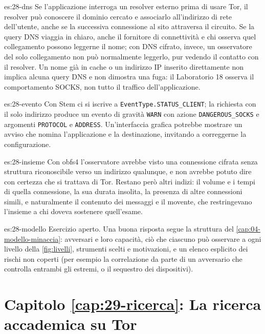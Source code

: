 \begin{soluzione}{es:28-dns}
Se l'applicazione interroga un resolver esterno prima di usare Tor, il resolver può conoscere il dominio cercato e associarlo all'indirizzo di rete dell'utente, anche se la successiva connessione al sito attraversa il circuito. Se la query DNS viaggia in chiaro, anche il fornitore di connettività e chi osserva quel collegamento possono leggerne il nome; con DNS cifrato, invece, un osservatore del solo collegamento non può normalmente leggerlo, pur vedendo il contatto con il resolver. Un nome già in cache o un indirizzo IP inserito direttamente non implica alcuna query DNS e non dimostra una fuga: il Laboratorio 18 osserva il comportamento SOCKS, non tutto il traffico dell'applicazione.
\end{soluzione}

\begin{soluzione}{es:28-evento}
Con Stem ci si iscrive a \texttt{EventType.STATUS\_CLIENT}; la richiesta con il solo indirizzo produce un evento di gravità \texttt{WARN} con azione \texttt{DANGEROUS\_SOCKS} e argomenti \texttt{PROTOCOL} e \texttt{ADDRESS}. Un'interfaccia grafica potrebbe mostrare un avviso che nomina l'applicazione e la destinazione, invitando a correggerne la configurazione.
\end{soluzione}

\begin{soluzione}{es:28-insieme}
Con obfs4 l'osservatore avrebbe visto una connessione cifrata senza struttura riconoscibile verso un indirizzo qualunque, e non avrebbe potuto dire con certezza che si trattava di Tor. Restano però altri indizi: il volume e i tempi di quella connessione, la sua durata insolita, la presenza di altre connessioni simili, e naturalmente il contenuto dei messaggi e il movente, che restringevano l'insieme a chi doveva sostenere quell'esame.
\end{soluzione}

\begin{soluzione}{es:28-modello}
Esercizio aperto. Una buona risposta segue la struttura del \cref{cap:04-modello-minaccia}: avversari e loro capacità, ciò che ciascuno può osservare a ogni livello della \cref{fig:livelli}, strumenti scelti e motivazioni, e un elenco esplicito dei rischi non coperti (per esempio la correlazione da parte di un avversario che controlla entrambi gli estremi, o il sequestro dei dispositivi).
\end{soluzione}

\section*{Capitolo \ref{cap:29-ricerca}: La ricerca accademica su Tor}

